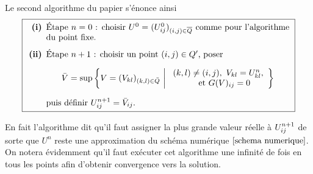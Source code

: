 Le second algorithme du papier s'énonce ainsi
\begin{equation}
\label{algo_papier_depart}
\fbox{%
  \begin{minipage}{0.9\linewidth}
    \begin{enumerate}
        \item[\textbf{(i)}] Étape \( n = 0 \) : choisir  \( U^0 = (U^0_{ij})_{(i,j)\in \overline{Q}} \) comme pour l'algorithme du point fixe.

        \item[\textbf{(ii)}] Étape \( n+1 \) : choisir un point \( (i,j) \in Q' \), poser
        \[
        \bar{V} = \sup \left\{ V = (V_{kl})_{(k,l) \in \bar{Q}} \ \middle| \
        \begin{array}{l}
        (k,l) \ne (i,j),\ V_{kl} = U^n_{kl}, \\
        \quad \quad \quad \text{et }  G(V)_{ij} = 0
        \end{array}
        \right\}
        \]
        puis définir \( U^{n+1}_{ij} = \bar{V}_{ij} \).
    \end{enumerate}
  \end{minipage}
}
\end{equation}
\begin{noremark}
    En fait l'algorithme dit qu'il faut assigner la plus grande valeur réelle à $U_{ij}^{n+1}$ de sorte que $U^n$ reste une approximation du schéma numérique $\eqref{schema numerique}$. On notera évidemment qu'il faut exécuter cet algorithme une infinité de fois en tous les points afin d'obtenir convergence vers la solution. 
\end{noremark}

